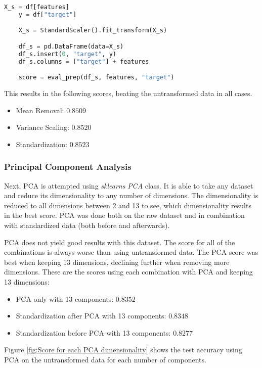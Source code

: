 \begin{lstlisting}[language=Python]
    X_s = df[features]
    y = df["target"]

    X_s = StandardScaler().fit_transform(X_s)

    df_s = pd.DataFrame(data=X_s)
    df_s.insert(0, "target", y)
    df_s.columns = ["target"] + features

    score = eval_prep(df_s, features, "target")
\end{lstlisting}

This results in the following scores, beating the untransformed data in all cases.

\begin{itemize}
    \item Mean Removal: $0.8509$
    \item Variance Scaling: $0.8520$
    \item Standardization: $0.8523$
\end{itemize}

\subsubsection{Principal Component Analysis}

Next, \ac{PCA} is attempted using \emph{sklearns} \emph{PCA} class. It is able to take any dataset and reduce
its dimensionality to any number of dimensions. The dimensionality is reduced to all dimensions
between 2 and 13 to see, which dimensionality results in the best score.
\ac{PCA} was done both on the raw dataset and in combination with standardized data (both before and afterwards).

\ac{PCA} does not yield good results with this dataset. The score for all of the combinations is always worse
than using untransformed data. 
The PCA score was best when keeping 13 dimensions, declining further when removing more dimensions.
These are the scores using each combination with PCA and keeping 13 dimensions:

\begin{itemize}
    \item PCA only with 13 components: $0.8352$
    \item Standardization after PCA with 13 components: $0.8348$
    \item Standardization before PCA with 13 components: $0.8277$
\end{itemize}

Figure \ref{fig:Score for each PCA dimensionality} shows the test accuracy using PCA on the untransformed data
for each number of components.

